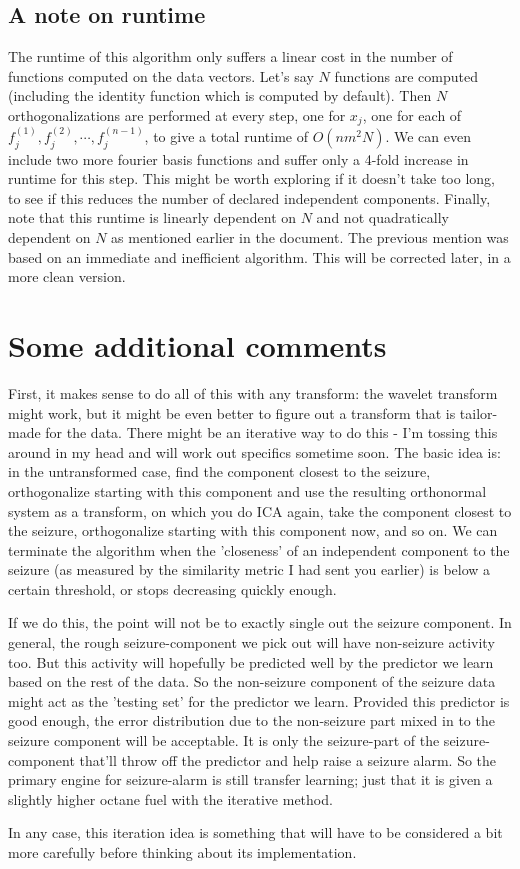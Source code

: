\documentclass[reqno]{amsart}
\begin{document}
\subsection{A note on runtime}
The runtime of this algorithm only suffers a linear cost in the number of functions computed on the data vectors. Let's say $N$ functions are computed (including the identity function which is computed by default). Then $N$ orthogonalizations are performed at every step, one for $x_j$, one for each of $f^{(1)} _j, f^{(2)} _j, \cdots, f^{(n-1)} _j$, to give a total runtime of $O(nm^2 N)$. We can even include two more fourier basis functions and suffer only a 4-fold increase in runtime for this step. This might be worth exploring if it doesn't take too long, to see if this reduces the number of declared independent components. Finally, note that this runtime is linearly dependent on $N$ and not quadratically dependent on $N$ as mentioned earlier in the document. The previous mention was based on an immediate and inefficient algorithm. This will be corrected later, in a more clean version.

\section{Some additional comments}
First, it makes sense to do all of this with any transform: the wavelet transform might work, but it might be even better to figure out a transform that  is tailor-made for the data. There might be an iterative way to do this - I'm tossing this around in my head and will work out specifics sometime soon. The basic idea is: in the untransformed case, find the component closest to the seizure, orthogonalize starting with this component and use the resulting orthonormal system as a transform, on which you do ICA again, take the component closest to the seizure, orthogonalize starting with this component now, and so on. We can terminate the algorithm when the 'closeness' of an independent component to the seizure (as measured by the similarity metric I had sent you earlier) is below a certain threshold, or stops decreasing quickly enough. 

If we do this, the point will not be to exactly single out the seizure component. In general, the rough seizure-component we pick out will have non-seizure activity too. But this activity will hopefully be predicted well by the predictor we learn based on the rest of the data. So the non-seizure component of the seizure data might act as the 'testing set' for the predictor we learn. Provided this predictor is good enough, the error distribution due to the non-seizure part mixed in to the seizure component will be acceptable. It is only the seizure-part of the seizure-component that'll throw off the predictor and help raise a seizure alarm. So the primary engine for seizure-alarm is still transfer learning; just that it is given a slightly higher octane fuel with the iterative method.

In any case, this iteration idea is something that will have to be considered a bit more carefully before thinking about its implementation.
\end{document}
